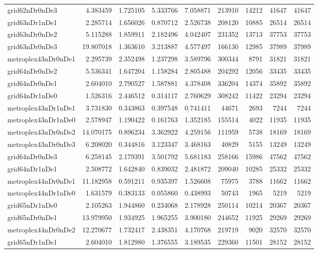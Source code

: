 \begin{longtable}{|l|r|r|r|r|r|r|r|r|}
grid62nDr0nDe3 & 4.383459 & 1.725105 & 5.333766 & 7.058871 & 213910 & 14212 & 41647 & 41647 \\
grid63nDr1nDe1 & 2.285714 & 1.656026 & 0.870712 & 2.526738 & 208120 & 10885 & 26514 & 26514 \\
grid63nDr0nDe2 & 5.115288 & 1.859911 & 2.182496 & 4.042407 & 231352 & 13713 & 37753 & 37753 \\
grid63nDr0nDe3 & 19.807018 & 1.363610 & 3.213887 & 4.577497 & 166130 & 12985 & 37989 & 37989 \\
metroplex43nDr0nDe1 & 2.295739 & 2.352498 & 1.237298 & 3.589796 & 300344 & 8791 & 31821 & 31821 \\
grid64nDr0nDe2 & 5.536341 & 1.647204 & 1.158284 & 2.805488 & 204292 & 12056 & 33435 & 33435 \\
grid64nDr0nDe1 & 2.604010 & 2.790527 & 1.587881 & 4.378408 & 336204 & 14374 & 35892 & 35892 \\
grid64nDr1nDe0 & 1.526316 & 2.446512 & 0.314117 & 2.760629 & 308242 & 11422 & 23294 & 23294 \\
metroplex43nDr1nDe1 & 3.731830 & 0.343863 & 0.397548 & 0.741411 & 44671 & 2693 & 7244 & 7244 \\
metroplex43nDr1nDe0 & 2.578947 & 1.190422 & 0.161763 & 1.352185 & 155514 & 4022 & 11935 & 11935 \\
metroplex43nDr0nDe2 & 14.070175 & 0.896234 & 3.362922 & 4.259156 & 111959 & 5738 & 18169 & 18169 \\
metroplex43nDr0nDe3 & 6.208020 & 0.344816 & 3.123347 & 3.468163 & 40829 & 5155 & 13249 & 13249 \\
grid64nDr0nDe3 & 6.258145 & 2.179391 & 3.501792 & 5.681183 & 258166 & 15986 & 47562 & 47562 \\
grid64nDr1nDe1 & 2.508772 & 1.642840 & 0.839032 & 2.481872 & 209040 & 10285 & 25332 & 25332 \\
metroplex44nDr0nDe1 & 11.182958 & 0.591211 & 0.935397 & 1.526608 & 75975 & 3788 & 11662 & 11662 \\
metroplex44nDr1nDe0 & 1.631579 & 0.383133 & 0.055860 & 0.438993 & 50743 & 1965 & 5219 & 5219 \\
grid65nDr1nDe0 & 2.105263 & 1.944860 & 0.234068 & 2.178928 & 250114 & 10214 & 20367 & 20367 \\
grid65nDr0nDe1 & 13.979950 & 1.934925 & 1.965255 & 3.900180 & 244652 & 11925 & 29269 & 29269 \\
metroplex44nDr0nDe2 & 12.270677 & 1.732417 & 2.438351 & 4.170768 & 219719 & 9020 & 32570 & 32570 \\
grid65nDr1nDe1 & 2.604010 & 1.812980 & 1.376555 & 3.189535 & 229360 & 11501 & 28152 & 28152 \\

\end{longtable}
